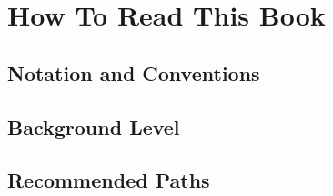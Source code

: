 \chapter{How To Read This Book}

\section{Notation and Conventions}












\section{Background Level}

\section{Recommended Paths}
